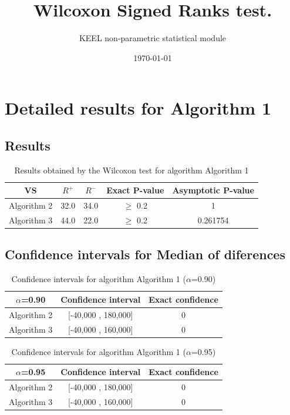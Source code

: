 \documentclass[a4paper,10pt]{article}
\title{Wilcoxon Signed Ranks test.}
\date{\today}
\author{KEEL non-parametric statistical module}
\begin{document}
\pagestyle{empty}
\maketitle
\thispagestyle{empty}



\section{Detailed results for Algorithm 1}


\subsection{Results}

\begin{table}[!htp]
\centering\small
\begin{tabular}{
|c|c|c|c|c|}
\hline
 VS & $R^{+}$ & $R^{-}$ & Exact P-value & Asymptotic P-value \\ \hline 
Algorithm 2 & 32.0 & 34.0 & $\geq$ 0.2 & 1\\ \hline 
Algorithm 3 & 44.0 & 22.0 & $\geq$ 0.2 & 0.261754\\ \hline 

\end{tabular}
\caption{Results obtained by the Wilcoxon test for algorithm Algorithm 1}
\end{table}

\subsection{Confidence intervals for Median of diferences}

\begin{table}[!htp]
\centering\small
\begin{tabular}{
|c|c|c|}
\hline
 $\alpha$=0.90 & Confidence interval & Exact confidence \\ \hline 
Algorithm 2 & [-40,000 , 180,000] & 0\\ \hline 
Algorithm 3 & [-40,000 , 160,000] & 0\\ \hline 

\end{tabular}
\caption{Confidence intervals for algorithm Algorithm 1 ($\alpha$=0.90)}
\end{table}
\begin{table}[!htp]
\centering\small
\begin{tabular}{
|c|c|c|}
\hline
 $\alpha$=0.95 & Confidence interval & Exact confidence \\ \hline 
Algorithm 2 & [-40,000 , 180,000] & 0\\ \hline 
Algorithm 3 & [-40,000 , 160,000] & 0\\ \hline 

\end{tabular}
\caption{Confidence intervals for algorithm Algorithm 1 ($\alpha$=0.95)}
\end{table}
\end{document}
